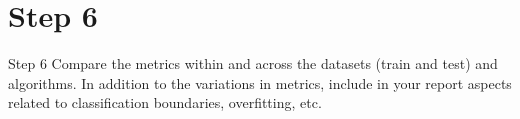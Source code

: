 \section*{Step 6}

\begin{custombox}[label={box:Q6}]{Step 6}
	Compare the metrics within and across the datasets (train and test) and algorithms. In addition to the variations in metrics, include in your report aspects related to classification boundaries, overfitting, etc.
\end{custombox}

\vspace{10mm}









